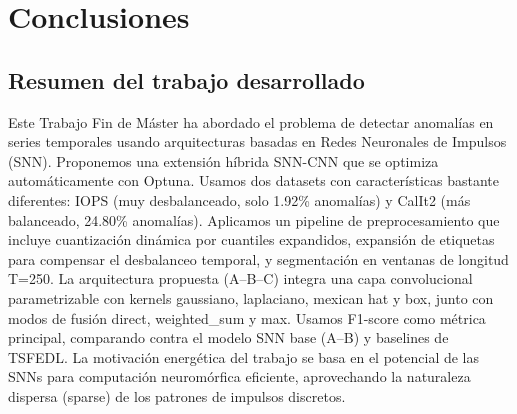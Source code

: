 \chapter{Conclusiones}

\section{Resumen del trabajo desarrollado}
Este Trabajo Fin de Máster ha abordado el problema de detectar anomalías en series temporales usando arquitecturas basadas en Redes Neuronales de Impulsos (SNN). Proponemos una extensión híbrida SNN-CNN que se optimiza automáticamente con Optuna. Usamos dos datasets con características bastante diferentes: IOPS (muy desbalanceado, solo 1.92\% anomalías) y CalIt2 (más balanceado, 24.80\% anomalías). Aplicamos un pipeline de preprocesamiento que incluye cuantización dinámica por cuantiles expandidos, expansión de etiquetas para compensar el desbalanceo temporal, y segmentación en ventanas de longitud T=250. La arquitectura propuesta (A--B--C) integra una capa convolucional parametrizable con kernels gaussiano, laplaciano, mexican hat y box, junto con modos de fusión direct, weighted\_sum y max. Usamos F1-score como métrica principal, comparando contra el modelo SNN base (A--B) y baselines de TSFEDL. La motivación energética del trabajo se basa en el potencial de las SNNs para computación neuromórfica eficiente, aprovechando la naturaleza dispersa (sparse) de los patrones de impulsos discretos.

